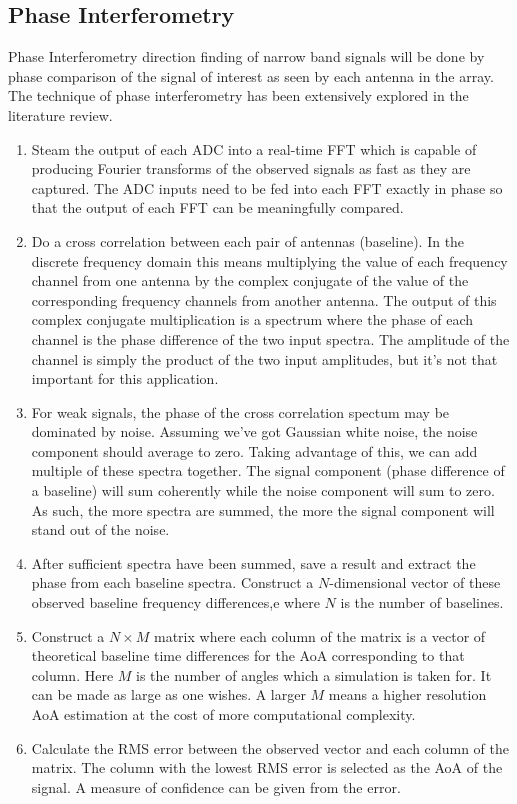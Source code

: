 \subsection{Phase Interferometry}
Phase Interferometry direction finding of narrow band signals will be done by phase comparison of the signal of interest as seen by each antenna in the array. The technique of phase interferometry has been extensively explored in the literature review.
\begin{enumerate}
  \item Steam the output of each ADC into a real-time FFT which is capable of producing Fourier transforms of the observed signals as fast as they are captured. The ADC inputs need to be fed into each FFT exactly in phase so that the output of each FFT can be meaningfully compared.
  \item Do a cross correlation between each pair of antennas (baseline). In the discrete frequency domain this means multiplying the value of each frequency channel from one antenna by the complex conjugate of the value of the corresponding frequency channels from another antenna. The output of this complex conjugate multiplication is a spectrum where the phase of each channel is the phase difference of the two input spectra. The amplitude of the channel is simply the product of the two input amplitudes, but it's not that important for this application.
  \item For weak signals, the phase of the cross correlation spectum may be dominated by noise. Assuming we've got Gaussian white noise, the noise component should average to zero. Taking advantage of this, we can add multiple of these spectra together. The signal component (phase difference of a baseline) will sum coherently while the noise component will sum to zero. As such, the more spectra are summed, the more the signal component will stand out of the noise.
  \item After sufficient spectra have been summed, save a result and extract the phase from each baseline spectra. Construct a \(N\)-dimensional vector of these observed baseline frequency differences,e where \(N\) is the number of baselines.
  \item Construct a \(N \times M\) matrix where each column of the matrix is a vector of theoretical baseline time differences for the AoA corresponding to that column. Here \(M\) is the number of angles which a simulation is taken for. It can be made as large as one wishes. A larger \(M\) means a higher resolution AoA estimation at the cost of more computational complexity.
  \item Calculate the RMS error between the observed vector and each column of the matrix. The column with the lowest RMS error is selected as the AoA of the signal. A measure of confidence can be given from the error.
\end{enumerate}

